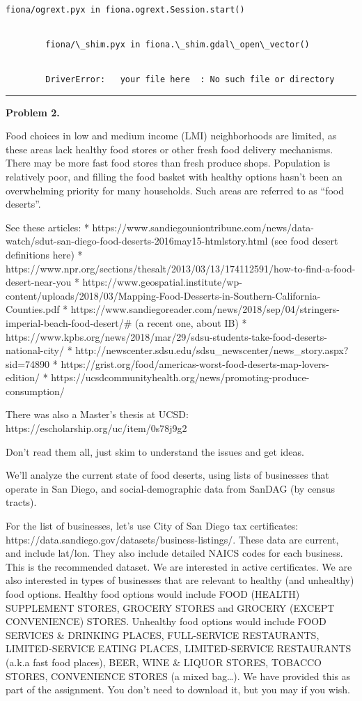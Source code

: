 \documentclass[11pt]{article}
\begin{document}
\begin{Verbatim}[commandchars=\\\{\}]
        fiona/ogrext.pyx in fiona.ogrext.Session.start()


        fiona/\_shim.pyx in fiona.\_shim.gdal\_open\_vector()


        DriverError:   your file here  : No such file or directory

    \end{Verbatim}

    \begin{center}\rule{0.5\linewidth}{\linethickness}\end{center}

\textbf{Problem 2.}

Food choices in low and medium income (LMI) neighborhoods are limited,
as these areas lack healthy food stores or other fresh food delivery
mechanisms. There may be more fast food stores than fresh produce shops.
Population is relatively poor, and filling the food basket with healthy
options hasn't been an overwhelming priority for many households. Such
areas are referred to as ``food deserts''.

See these articles: *
https://www.sandiegouniontribune.com/news/data-watch/sdut-san-diego-food-deserts-2016may15-htmlstory.html
(see food desert definitions here) *
https://www.npr.org/sections/thesalt/2013/03/13/174112591/how-to-find-a-food-desert-near-you
*
https://www.geospatial.institute/wp-content/uploads/2018/03/Mapping-Food-Desserts-in-Southern-California-Counties.pdf
*
https://www.sandiegoreader.com/news/2018/sep/04/stringers-imperial-beach-food-desert/\#
(a recent one, about IB) *
https://www.kpbs.org/news/2018/mar/29/sdsu-students-take-food-deserts-national-city/
* http://newscenter.sdsu.edu/sdsu\_newscenter/news\_story.aspx?sid=74890
* https://grist.org/food/americas-worst-food-deserts-map-lovers-edition/
* https://ucsdcommunityhealth.org/news/promoting-produce-consumption/

There was also a Master's thesis at UCSD:
https://escholarship.org/uc/item/0s78j9g2

Don't read them all, just skim to understand the issues and get ideas.

We'll analyze the current state of food deserts, using lists of
businesses that operate in San Diego, and social-demographic data from
SanDAG (by census tracts).

For the list of businesses, let's use City of San Diego tax
certificates: https://data.sandiego.gov/datasets/business-listings/.
These data are current, and include lat/lon. They also include detailed
NAICS codes for each business. This is the recommended dataset. We are
interested in active certificates. We are also interested in types of
businesses that are relevant to healthy (and unhealthy) food options.
Healthy food options would include FOOD (HEALTH) SUPPLEMENT STORES,
GROCERY STORES and GROCERY (EXCEPT CONVENIENCE) STORES. Unhealthy food
options would include FOOD SERVICES \& DRINKING PLACES, FULL-SERVICE
RESTAURANTS, LIMITED-SERVICE EATING PLACES, LIMITED-SERVICE RESTAURANTS
(a.k.a fast food places), BEER, WINE \& LIQUOR STORES, TOBACCO STORES,
CONVENIENCE STORES (a mixed bag\ldots{}). We have provided this as part
of the assignment. You don't need to download it, but you may if you
wish.
\end{document}

